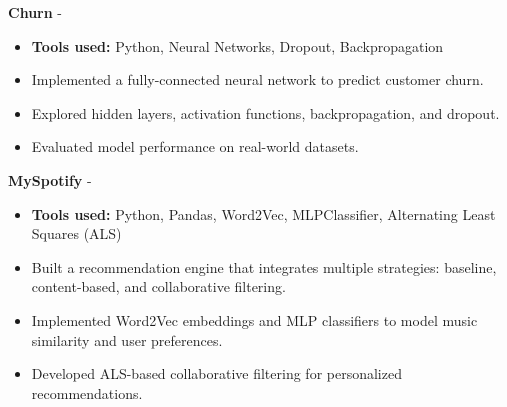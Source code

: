 \documentclass[a4paper,11pt]{article}%
\begin{document}
%
\noindent \textbf{Churn} - \href{https://github.com/sboof911/churn}{{}}%
\begin{itemize}[leftmargin=2em,label={},parsep=0pt,topsep=1em]%
\item \textbf{Tools used:} Python, Neural Networks, Dropout, Backpropagation%
\item Implemented a fully-connected neural network to predict customer churn.%
\item Explored hidden layers, activation functions, backpropagation, and dropout.%
\item Evaluated model performance on real-world datasets.%
\end{itemize}%
%
\noindent \textbf{MySpotify} - \href{https://github.com/sboof911/MySpotify}{{}}%
\begin{itemize}[leftmargin=2em,label={},parsep=0pt,topsep=1em]%
\item \textbf{Tools used:} Python, Pandas, Word2Vec, MLPClassifier, Alternating Least Squares (ALS)%
\item Built a recommendation engine that integrates multiple strategies: baseline, content-based, and collaborative filtering.%
\item Implemented Word2Vec embeddings and MLP classifiers to model music similarity and user preferences.%
\item Developed ALS-based collaborative filtering for personalized recommendations.%
\end{itemize}%
\end{document}
